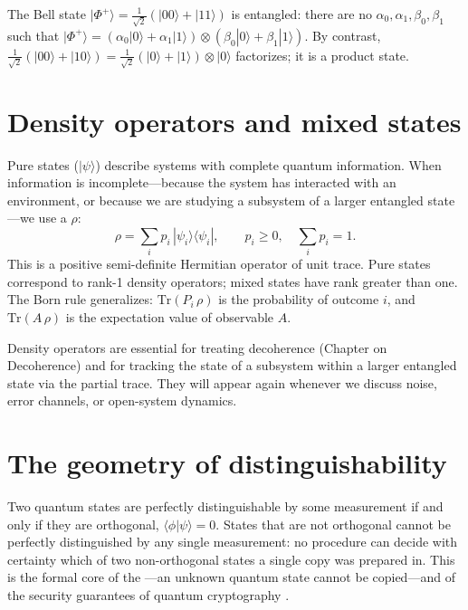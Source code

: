 \begin{example}
The Bell state $|\Phi^+\rangle = \frac{1}{\sqrt 2}(|00\rangle+|11\rangle)$ is entangled: there are no $\alpha_0, \alpha_1, \beta_0, \beta_1$ such that $|\Phi^+\rangle = (\alpha_0|0\rangle+\alpha_1|1\rangle)\otimes(\beta_0|0\rangle+\beta_1|1\rangle)$. By contrast, $\frac{1}{\sqrt 2}(|00\rangle+|10\rangle) = \frac{1}{\sqrt 2}(|0\rangle+|1\rangle)\otimes|0\rangle$ factorizes; it is a product state.
\end{example}

\section{Density operators and mixed states}

Pure states ($|\psi\rangle$) describe systems with complete quantum information. When information is incomplete---because the system has interacted with an environment, or because we are studying a subsystem of a larger entangled state---we use a  $\rho$:
\[
  \rho = \sum_i p_i\,|\psi_i\rangle\langle\psi_i|, \qquad p_i \geq 0, \quad \sum_i p_i = 1.
\]
This is a positive semi-definite Hermitian operator of unit trace. Pure states correspond to rank-1 density operators; mixed states have rank greater than one. The Born rule generalizes: $\mathrm{Tr}(P_i\,\rho)$ is the probability of outcome $i$, and $\mathrm{Tr}(A\,\rho)$ is the expectation value of observable $A$.

Density operators are essential for treating decoherence (Chapter on Decoherence) and for tracking the state of a subsystem within a larger entangled state via the partial trace. They will appear again whenever we discuss noise, error channels, or open-system dynamics.

\section{The geometry of distinguishability}

Two quantum states are perfectly distinguishable by some measurement if and only if they are orthogonal, $\langle\phi|\psi\rangle = 0$. States that are not orthogonal cannot be perfectly distinguished by any single measurement: no procedure can decide with certainty which of two non-orthogonal states a single copy was prepared in. This is the formal core of the ---an unknown quantum state cannot be copied---and of the security guarantees of quantum cryptography \citep{bennett_quantum_2014}.

